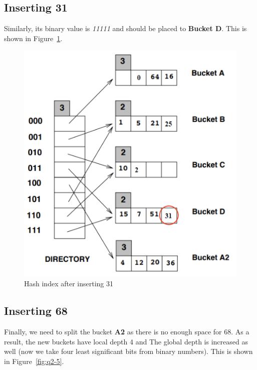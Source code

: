 \subsection{Inserting 31}

Similarly, its binary value is \textit{11111} and should be placed to \textbf{Bucket D}.
This is shown in Figure~\ref{fig:q2-4}.

\begin{figure}[H]
  \centering
  \includegraphics[width=0.9\linewidth]{figs/q2-4.png}
  \caption{Hash index after inserting 31}
  \label{fig:q2-4}
\end{figure}

\subsection{Inserting 68}

Finally, we need to split the bucket \textbf{A2} as there is no enough space for 68.
As a result, the new buckets have local depth 4 and The global depth is increased as well (now we take four least significant bits from binary numbers).
This is shown in Figure~\ref{fig:q2-5}.

